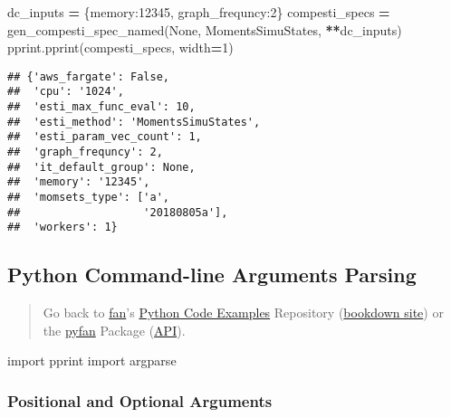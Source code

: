 \documentclass[
]{book}
\newenvironment{Shaded}{\begin{snugshade}}{\end{snugshade}}
\newcommand{\DecValTok}[1]{\textcolor[rgb]{0.00,0.00,0.81}{#1}}
\newcommand{\ImportTok}[1]{#1}
\newcommand{\NormalTok}[1]{#1}
\newcommand{\OperatorTok}[1]{\textcolor[rgb]{0.81,0.36,0.00}{\textbf{#1}}}
\newcommand{\StringTok}[1]{\textcolor[rgb]{0.31,0.60,0.02}{#1}}
\newcommand{\VariableTok}[1]{\textcolor[rgb]{0.00,0.00,0.00}{#1}}
\begin{document}
\begin{Shaded}
\begin{Highlighting}[]
\NormalTok{dc\_inputs }\OperatorTok{=}\NormalTok{ \{}\StringTok{\textquotesingle{}memory\textquotesingle{}}\NormalTok{:}\DecValTok{12345}\NormalTok{, }\StringTok{\textquotesingle{}graph\_frequncy\textquotesingle{}}\NormalTok{:}\DecValTok{2}\NormalTok{\}}
\NormalTok{compesti\_specs }\OperatorTok{=}\NormalTok{ gen\_compesti\_spec\_named(}\VariableTok{None}\NormalTok{, }\StringTok{\textquotesingle{}MomentsSimuStates\textquotesingle{}}\NormalTok{, }\OperatorTok{**}\NormalTok{dc\_inputs)}
\NormalTok{pprint.pprint(compesti\_specs, width}\OperatorTok{=}\DecValTok{1}\NormalTok{)}
\end{Highlighting}
\end{Shaded}

\begin{verbatim}
## {'aws_fargate': False,
##  'cpu': '1024',
##  'esti_max_func_eval': 10,
##  'esti_method': 'MomentsSimuStates',
##  'esti_param_vec_count': 1,
##  'graph_frequncy': 2,
##  'it_default_group': None,
##  'memory': '12345',
##  'momsets_type': ['a',
##                   '20180805a'],
##  'workers': 1}
\end{verbatim}

\hypertarget{python-command-line-arguments-parsing}{%
\subsection{Python Command-line Arguments Parsing}\label{python-command-line-arguments-parsing}}

\begin{quote}
Go back to \href{http://fanwangecon.github.io/}{fan}'s \href{https://fanwangecon.github.io/Py4Econ/}{Python Code Examples} Repository (\href{https://fanwangecon.github.io/Py4Econ/bookdown}{bookdown site}) or the \href{https://pyfan.readthedocs.io/en/latest/}{pyfan} Package (\href{https://pyfan.readthedocs.io/en/latest/reference.html}{API}).
\end{quote}

\begin{Shaded}
\begin{Highlighting}[]
\ImportTok{import}\NormalTok{ pprint}
\ImportTok{import}\NormalTok{ argparse}
\end{Highlighting}
\end{Shaded}

\hypertarget{positional-and-optional-arguments}{%
\subsubsection{Positional and Optional Arguments}\label{positional-and-optional-arguments}}
\end{document}
